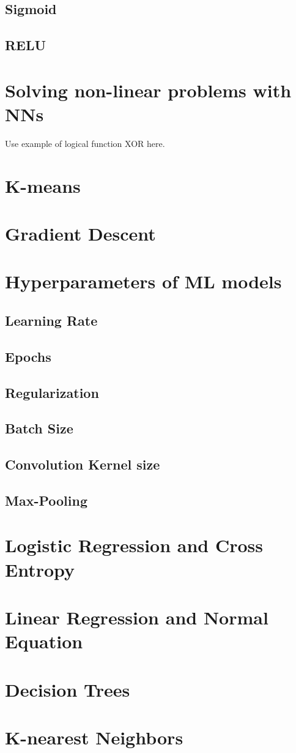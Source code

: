 \subsection{Sigmoid}
\subsection{RELU}

\section{Solving non-linear problems with NNs}

\label{sec:solving_non_linear_problems_with_nns}

Use example of logical function XOR here.

\section{K-means}

\section{Gradient Descent}

\section{Hyperparameters of ML models}

\subsection{Learning Rate}
\subsection{Epochs}
\subsection{Regularization}
\subsection{Batch Size}
\subsection{Convolution Kernel size}
\subsection{Max-Pooling}

\section{Logistic Regression and Cross Entropy}


\section{Linear Regression and Normal Equation}


\section{Decision Trees}


\section{K-nearest Neighbors}

